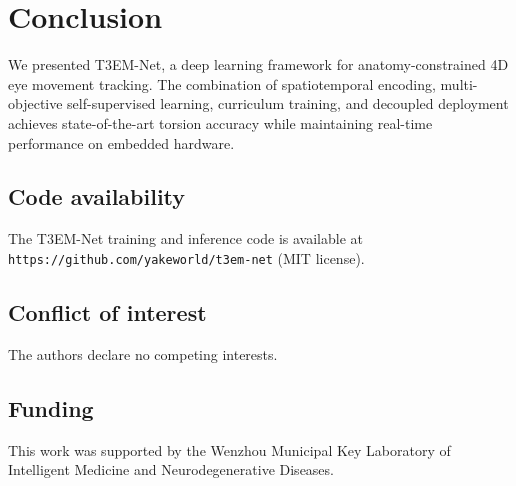 \documentclass[review]{elsarticle}
\begin{document}
\section{Conclusion}
\label{sec:conclusion}

We presented T3EM-Net, a deep learning framework for anatomy-constrained 4D eye movement tracking. The combination of spatiotemporal encoding, multi-objective self-supervised learning, curriculum training, and decoupled deployment achieves state-of-the-art torsion accuracy while maintaining real-time performance on embedded hardware.

\subsection*{Code availability}
The T3EM-Net training and inference code is available at \texttt{https://github.com/yakeworld/t3em-net} (MIT license).

\subsection*{Conflict of interest}
The authors declare no competing interests.

\subsection*{Funding}
This work was supported by the Wenzhou Municipal Key Laboratory of Intelligent Medicine and Neurodegenerative Diseases.



\end{document}
